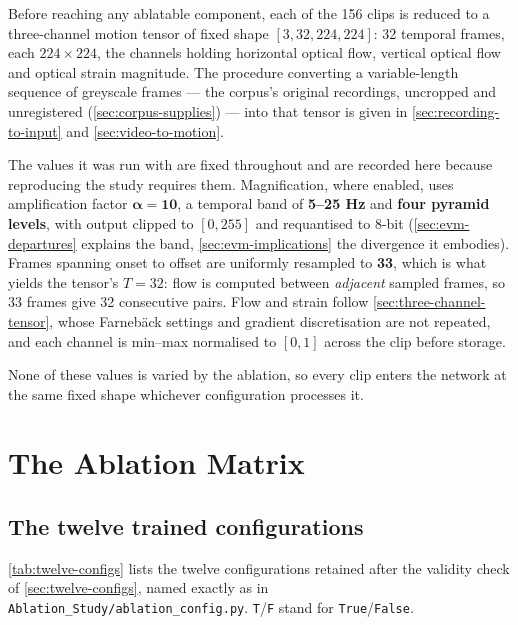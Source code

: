 Before reaching any ablatable component, each of the 156 clips is reduced to a three-channel motion tensor of fixed shape $[3, 32, 224, 224]$: 32 temporal frames, each $224 \times 224$, the channels holding horizontal optical flow, vertical optical flow and optical strain magnitude. The procedure converting a variable-length sequence of greyscale frames --- the corpus's original recordings, uncropped and unregistered (\autoref{sec:corpus-supplies}) --- into that tensor is given in \autoref{sec:recording-to-input} and \autoref{sec:video-to-motion}.

The values it was run with are fixed throughout and are recorded here because reproducing the study requires them. Magnification, where enabled, uses amplification factor $\boldsymbol{\alpha = 10}$, a temporal band of \textbf{5--25 Hz} and \textbf{four pyramid levels}, with output clipped to $[0,255]$ and requantised to 8-bit (\autoref{sec:evm-departures} explains the band, \autoref{sec:evm-implications} the divergence it embodies). Frames spanning onset to offset are uniformly resampled to \textbf{33}, which is what yields the tensor's $T = 32$: flow is computed between \textit{adjacent} sampled frames, so 33 frames give 32 consecutive pairs. Flow and strain follow \autoref{sec:three-channel-tensor}, whose Farneb\"ack settings and gradient discretisation are not repeated, and each channel is min--max normalised to $[0,1]$ across the clip before storage.

None of these values is varied by the ablation, so every clip enters the network at the same fixed shape whichever configuration processes it.


\section{The Ablation Matrix}
\label{sec:ablation-matrix}

\subsection{The twelve trained configurations}
\label{sec:twelve-trained}

\autoref{tab:twelve-configs} lists the twelve configurations retained after the validity check of \autoref{sec:twelve-configs}, named exactly as in \texttt{Ablation\_Study/ablation\_config.py}. \texttt{T}/\texttt{F} stand for \texttt{True}/\texttt{False}.

